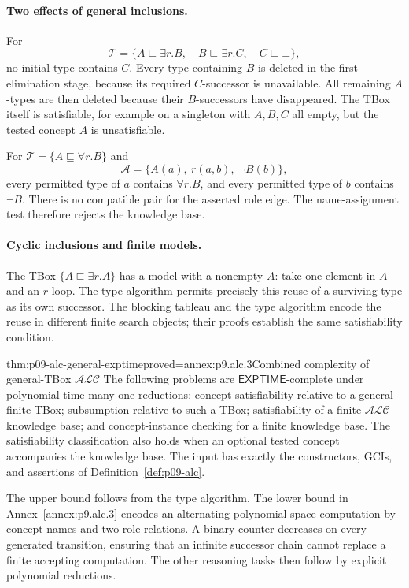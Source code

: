 \paragraph{Two effects of general inclusions.}
For
\[
 \mathcal T=\{A\sqsubseteq\exists r.B,\quad
              B\sqsubseteq\exists r.C,\quad C\sqsubseteq\bot\},
\]
no initial type contains \(C\).
Every type containing \(B\) is deleted in the first elimination stage,
because its required \(C\)-successor is unavailable.
All remaining \(A\)-types are then deleted because their \(B\)-successors
have disappeared.
The TBox itself is satisfiable, for example on a singleton with
\(A,B,C\) all empty, but the tested concept \(A\) is unsatisfiable.

For \(\mathcal T=\{A\sqsubseteq\forall r.B\}\) and
\[
 \mathcal A=\{A(a),\ r(a,b),\ \neg B(b)\},
\]
every permitted type of \(a\) contains \(\forall r.B\), and every
permitted type of \(b\) contains \(\neg B\).
There is no compatible pair for the asserted role edge.
The name-assignment test therefore rejects the knowledge base.

\paragraph{Cyclic inclusions and finite models.}
The TBox \(\{A\sqsubseteq\exists r.A\}\) has a model with a
nonempty \(A\): take one element in \(A\) and an \(r\)-loop.
The type algorithm permits precisely this reuse of a surviving
type as its own successor.
The blocking tableau and the type algorithm encode the reuse in
different finite search objects; their proofs establish the same
satisfiability condition.

\begin{hbtheorem}{thm:p09-alc-general-exptime}{proved=annex:p9.alc.3}{Combined complexity of general-TBox \(\mathcal{ALC}\)}
The following problems are \(\mathsf{EXPTIME}\)-complete under
polynomial-time many-one reductions:
concept satisfiability relative to a general finite TBox;
subsumption relative to such a TBox;
satisfiability of a finite \(\mathcal{ALC}\) knowledge base; and
concept-instance checking for a finite knowledge base.
The satisfiability classification also holds when an optional
tested concept accompanies the knowledge base.
The input has exactly the constructors, GCIs, and assertions of
Definition~\ref{def:p09-alc}.
\end{hbtheorem}

The upper bound follows from the type algorithm.
The lower bound in Annex~\ref{annex:p9.alc.3} encodes an alternating
polynomial-space computation by concept names and two role relations.
A binary counter decreases on every generated transition, ensuring that
an infinite successor chain cannot replace a finite accepting computation.
The other reasoning tasks then follow by explicit polynomial reductions.

